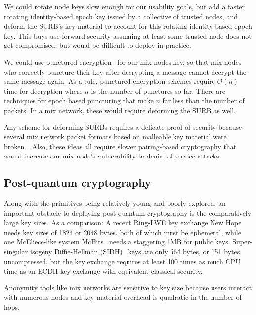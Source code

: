 \documentclass[twoside,letterpaper]{llncs}
\begin{document}
We could rotate node keys slow enough for our usability goals, but add
a faster rotating identity-based epoch key issued by a collective of
trusted nodes, and deform the SURB's key material to account for this
rotating identity-based epoch key.
This buys use forward security
assuming at least some trusted node does not get compromised, but
would be difficult to deploy in practice. 

We could use punctured encryption~\cite{libforwardsec} for our
mix nodes key, so that mix nodes who correctly puncture their key
after decrypting a message cannot decrypt the same message again. 
As a rule, punctured encryption schemes require $O(n)$ time for
decryption where $n$ is the number of punctures so far.  There are
techniques for epoch based puncturing that make $n$ far less than
the number of packets.  In a mix network, these would require
deforming the SURB as well. 

Any scheme for deforming SURBs requires a delicate proof of security
because several mix network packet formats based on malleable key
material were broken~\cite{Danezis2006}. 
Also, these ideas all require slower pairing-based cryptography that
would increase our mix node's vulnerability to denial of service attacks. 


\subsection{Post-quantum cryptography}

Along with the primitives being relatively young and poorly explored,
an important obstacle to deploying post-quantum cryptography is
the comparatively large key sizes.  As a comparison: 
%
A recent Ring-LWE key exchange New Hope~\cite[\S7, p.10]{NewHope} needs
 key sizes of 1824 or 2048 bytes, both of which must be ephemeral,
while one McEliece-like system McBits~\cite{McBits,InitRec}
 needs a staggering 1MB for public keys.
%
Super-singular isogeny Diffie-Hellman (SIDH)~\cite[p. 21]{SIDH-2016} keys
are only 564 bytes, or 751 bytes uncompressed, but
 the key exchange requires at least 100 times as much CPU time as
 an ECDH key exchange with equivalent classical security.

Anonymity tools like mix networks are sensitive to key size because 
users interact with numerous nodes and key material overhead is 
quadratic in the number of hops. %
\end{document}

